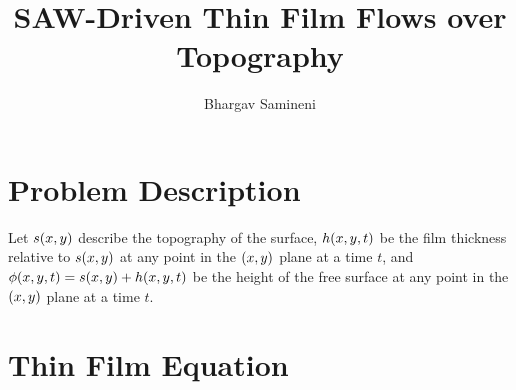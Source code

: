 \documentclass[letterpaper]{article}
\title{SAW-Driven Thin Film Flows over Topography}
\author{Bhargav Samineni}
\date{}
\begin{document}
 
\maketitle

\section{Problem Description}

Let $s\!\left( x, y \right)$ describe the topography of the surface, 
$h\!\left( x,y,t \right)$ be the film thickness relative to $s\!\left( x,y \right)$ at any point in the $\left( x,y \right)$ plane at a time $t$, 
and $\phi\!\left( x,y,t \right) = s\!\left( x,y \right) + h\!\left( x,y,t \right)$ be the height of the free surface at any point in the $\left( x,y \right)$ plane at a time $t$.

\section{Thin Film Equation}

 
\newpage
\printbibliography
\end{document}
